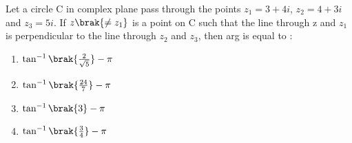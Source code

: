 \item Let a circle C in complex plane pass through the points $z_1=3+4i$, $z_2=4+3i$ and $z_3=5i$. If $z\brak{\neq z_1}$ is a point on C such that the line through z and $z_1$ is perpendicular to the line through $z_2$ and $z_3$, then arg is equal to :
	\begin{enumerate}
		\item $\tan^{-1}\brak{\frac{2}{\sqrt{5}}} - \pi$
		\item $\tan^{-1}\brak{\frac{24}{7}} - \pi$
		\item $\tan^{-1}\brak{3} - \pi$
		\item $\tan^{-1}\brak{\frac{3}{4}} - \pi$
	\end{enumerate}

